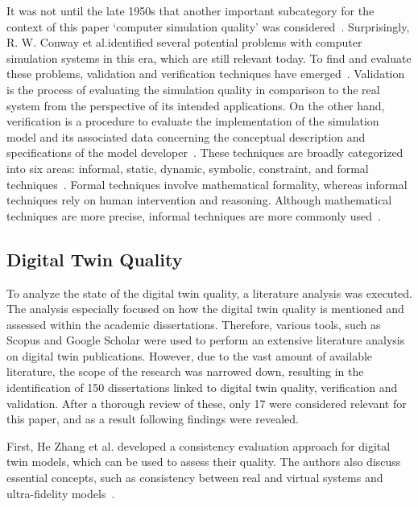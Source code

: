 \documentclass{llncs}
\begin{document}
    It was not until the late 1950s that another important subcategory for the context of this paper `computer simulation quality' 
    was considered~\cite{SomeProblemsofDigitalSystemsSimulation}. Surprisingly, R. W. Conway et al.identified several potential problems with computer simulation systems in this era, which are still relevant today.  
    To find and evaluate these problems, validation and verification techniques have emerged~\cite{StewartSimulation,VerificationValidationSergent,OsmanBalci}. 
    Validation is the process of evaluating the simulation quality in comparison to the real system from the perspective of its intended applications. 
    On the other hand, verification is a procedure to evaluate the implementation of the simulation model and its associated data concerning the conceptual description and specifications of 
    the model developer~\cite{StewartSimulation,VerificationValidationSergent}. These techniques are broadly categorized into six areas: informal, static, dynamic, symbolic, constraint, 
    and formal techniques~\cite{balcicategories,balcitechniques}. Formal techniques involve mathematical formality, 
    whereas informal techniques rely on human intervention and reasoning. Although mathematical techniques are more precise, informal techniques are more commonly used~\cite{balcicategories}.

    \subsection{Digital Twin Quality}
    To analyze the state of the digital twin quality, a literature analysis was executed. 
    The analysis especially focused on how the digital twin quality is mentioned and assessed within the academic dissertations. Therefore, various tools, such as Scopus and Google Scholar were 
    used to perform an extensive literature analysis on digital twin publications. However, due to the vast amount of available literature, the scope of the research was narrowed down, resulting in the identification of 
    150 dissertations linked to digital twin quality, verification and validation. After a thorough review of these, only 17 were considered relevant for this paper, and as a result following findings were revealed.
  
    First, He Zhang et al. developed a consistency evaluation approach for digital twin models, which can be used to assess their quality. 
    The authors also discuss essential concepts, such as consistency between real and virtual systems and ultra-fidelity models~\cite{ZHANGEVALUATIONMETHOD}. 
\end{document}
